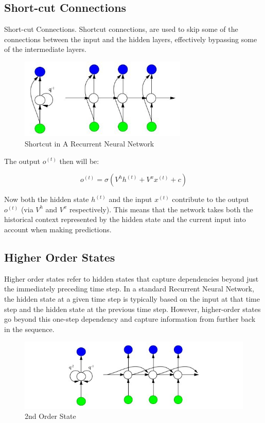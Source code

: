 \subsection{Short-cut Connections}

Short-cut Connections. Shortcut connections, are used to skip some of the connections between the input and the hidden layers, effectively bypassing some of the intermediate layers.

\begin{figure}[h]
    \centering
    \includegraphics[width=8cm]{Images/short-cut-RNN.jpg}
    \caption{Shortcut in A Recurrent Neural Network}
    \label{fig:shortcut}
\end{figure}

\noindent The output $o^{(t)}$ then will be:

$$ o^{(t)} = \sigma \left(V^{h} h^{(t)} + V^{x} x^{(t)} + c \right) $$

Now both the hidden state $h^{(t)}$ and the input $x^{(t)}$ contribute to the output $o^{(t)}$ (via $V^{h}$ and $V^{x}$ respectively). This means that the network takes both the historical context represented by the hidden state and the current input into account when making predictions.

\subsection{Higher Order States}

Higher order states refer to hidden states that capture dependencies beyond just the immediately preceding time step. In a standard Recurrent Neural Network, the hidden state at a given time step is typically based on the input at that time step and the hidden state at the previous time step. However, higher-order states go beyond this one-step dependency and capture information from further back in the sequence.

\begin{figure}[h]
    \centering
    \includegraphics[width=12cm]{Images/higher-order-RNN.jpg}
    \caption{2nd Order State}
    \label{fig:higher-order}
\end{figure}

